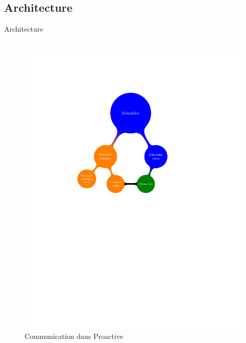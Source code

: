 \documentclass{beamer}
\begin{document}
\subsection{Architecture}
\begin{frame}
	\tableofcontents[currentsubsection]
\end{frame}
\begin{frame}{Architecture}
	\begin{columns}
	\begin{column}[l]{0.5\linewidth}
        \begin{figure}
            \centering
            \includegraphics[trim=4cm 13cm 2cm 5cm,scale=0.48]{netmap_abs.pdf}
            \caption{Communication dans Proactive}
        \end{figure}
	\end{column}

\end{columns}
\end{frame}
\end{document}
